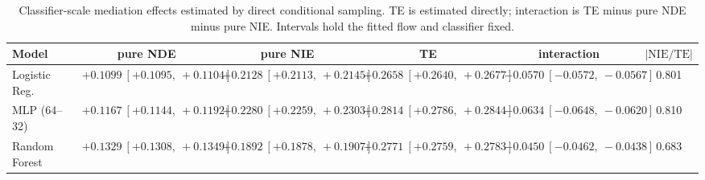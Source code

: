 \begin{table}[htbp]
  \centering
  \caption{Classifier-scale mediation effects estimated by direct conditional sampling. TE is estimated directly; interaction is TE minus pure NDE minus pure NIE. Intervals hold the fitted flow and classifier fixed.}
  \label{tab:bar_gap_overall}
  \begin{tabular}{lccccc}
    \toprule
    Model & pure NDE & pure NIE & TE & interaction & $|\mathrm{NIE}/\mathrm{TE}|$ \\
    \midrule
    Logistic Reg. & $+0.1099\ [+0.1095,\ +0.1104]$ & $+0.2128\ [+0.2113,\ +0.2145]$ & $+0.2658\ [+0.2640,\ +0.2677]$ & $-0.0570\ [-0.0572,\ -0.0567]$ & 0.801 \\
    MLP (64--32) & $+0.1167\ [+0.1144,\ +0.1192]$ & $+0.2280\ [+0.2259,\ +0.2303]$ & $+0.2814\ [+0.2786,\ +0.2844]$ & $-0.0634\ [-0.0648,\ -0.0620]$ & 0.810 \\
    Random Forest & $+0.1329\ [+0.1308,\ +0.1349]$ & $+0.1892\ [+0.1878,\ +0.1907]$ & $+0.2771\ [+0.2759,\ +0.2783]$ & $-0.0450\ [-0.0462,\ -0.0438]$ & 0.683 \\
    \bottomrule
  \end{tabular}
\end{table}